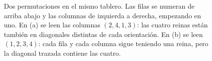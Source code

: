 \begin{figure}[htbp]
\centering
{}
\caption{Dos permutaciones en el mismo tablero. Las filas se numeran de arriba abajo y las columnas
de izquierda a derecha, empezando en uno. En (a) se leen las columnas $(2,4,1,3)$: las cuatro
reinas están también en diagonales distintas de cada orientación. En (b) se leen $(1,2,3,4)$:
cada fila y cada columna sigue teniendo una reina, pero la diagonal trazada contiene las cuatro.}
\label{fig:permutaciones}
\end{figure}

